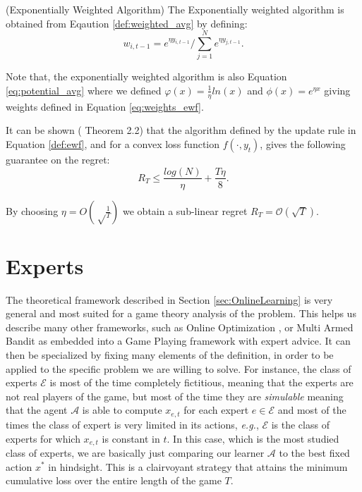 \begin{definition}(Exponentially Weighted Algorithm)\label{def:ewf}
	The Exponentially weighted algorithm is obtained from Eqaution \eqref{def:weighted_avg} by defining:
	\begin{equation}\label{eq:weights_ewf}
	w_{i,t-1}=e^{\eta y_{i,t-1}}/\sum\limits_{j=1}^Ne^{\eta y_{j,t-1}}.
	\end{equation}
\end{definition}

Note that, the exponentially weighted algorithm is also Equation \eqref{eq:potential_avg} where we defined $\varphi(x)=\frac{1}{\eta}ln(x)$ and $\phi(x)=e^{\eta x}$ giving weights defined in Equation \eqref{eq:weights_ewf}.

It can be shown (\cite{cesa2006prediction} Theorem 2.2) that the algorithm defined by the update rule in Equation \eqref{def:ewf}, and for a convex loss function $f(\cdot,y_t)$, gives the following guarantee on the regret:
\begin{equation}\label{eq:regret_ewf}
R_T\le \frac{log(N)}{\eta}+\frac{T\eta}{8}.
\end{equation}

By choosing $\eta=O\left(\sqrt\frac{1}{T}\right)$ we obtain a sub-linear regret $R_T=\mathcal O(\sqrt T)$. %



\section{Experts}
The theoretical framework described in Section \ref{sec:OnlineLearning} is very general and most suited for a game theory analysis of the problem. This helps us describe many other frameworks, such as Online Optimization \cite{hazan2016introduction}, or Multi Armed Bandit \cite{bubeck2012regret} as embedded into a Game Playing framework with expert advice. It can then be specialized by fixing many elements of the definition, in order to be applied to the specific problem we are willing to solve.
For instance, the class of experts $\mathcal E$ is most of the time completely fictitious, meaning that the experts are not real players of the game, but most of the time they are \emph{simulable} meaning that the agent $\mathcal A$ is able to compute $x_{e,t}$ for each expert $e\in\mathcal E$ and most of the times the class of expert is very limited in its actions, \emph{e.g.}, $\mathcal E$ is the class of experts for which $x_{e,t}$ is constant in $t$. In this case, which is the most studied class of experts, we are basically just comparing our learner $\mathcal A$ to the best fixed action $x^*$ in hindsight. This is a clairvoyant strategy that attains the minimum cumulative loss over the entire length of the game $T$.

